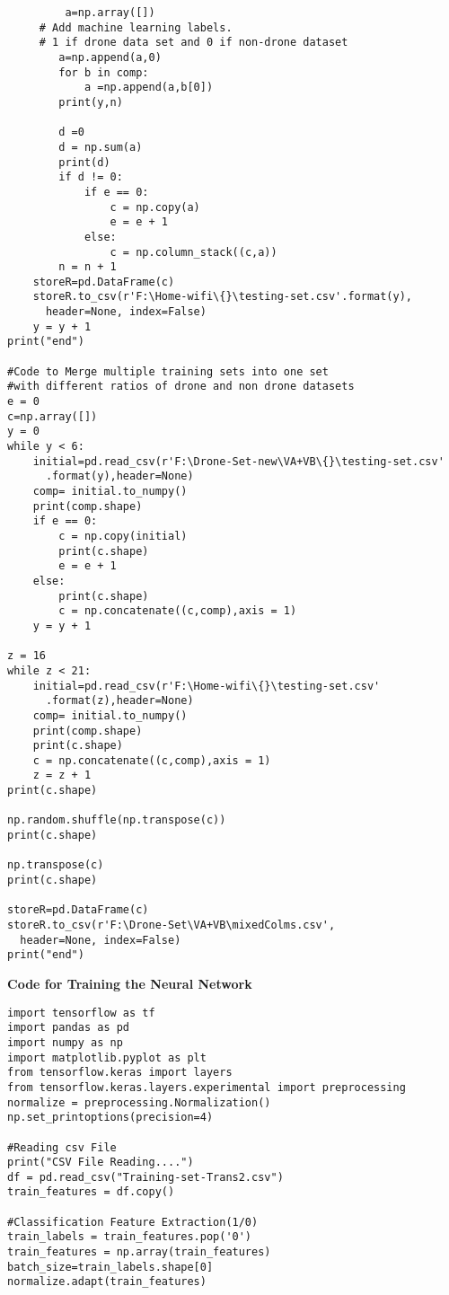 \begin{appendices}
\begin{verbatim}
         a=np.array([])
     # Add machine learning labels.
     # 1 if drone data set and 0 if non-drone dataset 
        a=np.append(a,0)	
        for b in comp:
            a =np.append(a,b[0])
        print(y,n)
        
        d =0
        d = np.sum(a)
        print(d)
        if d != 0:
            if e == 0:
                c = np.copy(a)
                e = e + 1
            else:
                c = np.column_stack((c,a))                      
        n = n + 1
    storeR=pd.DataFrame(c)
    storeR.to_csv(r'F:\Home-wifi\{}\testing-set.csv'.format(y),
      header=None, index=False)
    y = y + 1
print("end")

#Code to Merge multiple training sets into one set 
#with different ratios of drone and non drone datasets 
e = 0
c=np.array([])
y = 0
while y < 6:
    initial=pd.read_csv(r'F:\Drone-Set-new\VA+VB\{}\testing-set.csv'
      .format(y),header=None)
    comp= initial.to_numpy()
    print(comp.shape)
    if e == 0:
        c = np.copy(initial)
        print(c.shape)
        e = e + 1
    else:
        print(c.shape)
        c = np.concatenate((c,comp),axis = 1)
    y = y + 1
    
z = 16
while z < 21:
    initial=pd.read_csv(r'F:\Home-wifi\{}\testing-set.csv'
      .format(z),header=None)
    comp= initial.to_numpy()
    print(comp.shape)
    print(c.shape)
    c = np.concatenate((c,comp),axis = 1)
    z = z + 1
print(c.shape)

np.random.shuffle(np.transpose(c))
print(c.shape)

np.transpose(c)
print(c.shape)

storeR=pd.DataFrame(c)
storeR.to_csv(r'F:\Drone-Set\VA+VB\mixedColms.csv',
  header=None, index=False)
print("end")   
  \end{verbatim}
  \newpage

  \textbf{Code for Training the Neural Network}
 \begin{verbatim} 
import tensorflow as tf
import pandas as pd
import numpy as np
import matplotlib.pyplot as plt
from tensorflow.keras import layers
from tensorflow.keras.layers.experimental import preprocessing
normalize = preprocessing.Normalization()
np.set_printoptions(precision=4)  

#Reading csv File
print("CSV File Reading....") 
df = pd.read_csv("Training-set-Trans2.csv")
train_features = df.copy()

#Classification Feature Extraction(1/0)
train_labels = train_features.pop('0')    
train_features = np.array(train_features)
batch_size=train_labels.shape[0]
normalize.adapt(train_features)


\end{verbatim}
\end{appendices}
